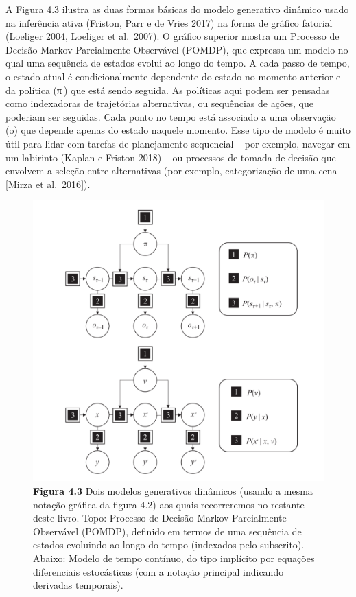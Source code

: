 \documentclass[
  12pt,
]{book}
\begin{document}
A Figura 4.3 ilustra as duas formas básicas do modelo generativo
dinâmico usado na inferência ativa (Friston, Parr e de Vries 2017) na
forma de gráfico fatorial (Loeliger 2004, Loeliger et al.~2007). O
gráfico superior mostra um Processo de Decisão Markov Parcialmente
Observável (POMDP), que expressa um modelo no qual uma sequência de
estados evolui ao longo do tempo. A cada passo de tempo, o estado atual
é condicionalmente dependente do estado no momento anterior e da
política (π ) que está sendo seguida. As políticas aqui podem ser
pensadas como indexadoras de trajetórias alternativas, ou sequências de
ações, que poderiam ser seguidas. Cada ponto no tempo está associado a
uma observação (o) que depende apenas do estado naquele momento. Esse
tipo de modelo é muito útil para lidar com tarefas de planejamento
sequencial -- por exemplo, navegar em um labirinto (Kaplan e Friston
2018) -- ou processos de tomada de decisão que envolvem a seleção entre
alternativas (por exemplo, categorização de uma cena {[}Mirza et al.~2016{]}).

\begin{figure}
\centering
\includegraphics{images/Figura_4_3.png}
\caption{\textbf{Figura 4.3} Dois modelos generativos dinâmicos (usando a mesma
notação gráfica da figura 4.2) aos quais recorreremos no restante deste
livro. Topo: Processo de Decisão Markov Parcialmente Observável (POMDP),
definido em termos de uma sequência de estados evoluindo ao longo do
tempo (indexados pelo subscrito). Abaixo: Modelo de tempo contínuo, do
tipo implícito por equações diferenciais estocásticas (com a notação
principal indicando derivadas temporais).}
\end{figure}
\end{document}
